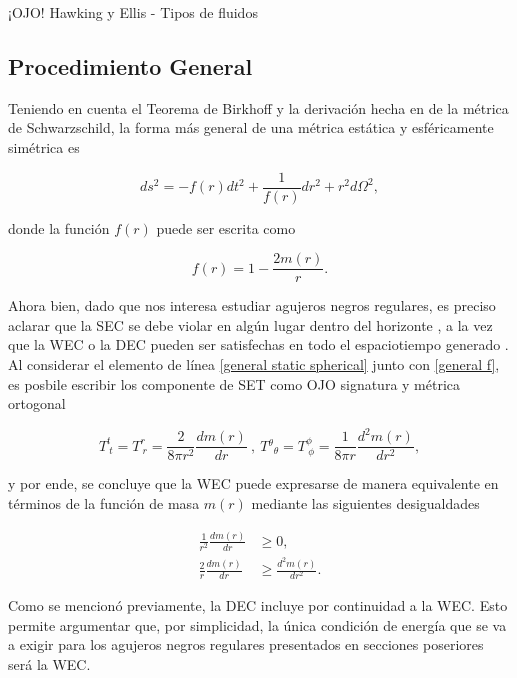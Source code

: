 \documentclass{article}
\numberwithin{equation}{section}
\theoremstyle{definition}
\begin{document}
¡OJO! Hawking y Ellis - Tipos de fluidos

\subsection{Procedimiento General}

Teniendo en cuenta el Teorema de Birkhoff \cite{gravitation} y la derivación hecha en \cite[Cap. 7]{carroll-lecture-notes} de la métrica de Schwarzschild, la forma más general de una métrica estática y esféricamente simétrica es

\begin{equation}
\label{general static spherical}
ds^2 = -f(r)dt^2 + \frac{1}{f(r)}dr^2 + r^2d\Omega^2,
\end{equation}

donde la función $f(r)$ puede ser escrita como

\begin{equation}
\label{general f}
f(r) = 1 - \frac{2m(r)}{r}.
\end{equation}

Ahora bien, dado que nos interesa estudiar agujeros negros regulares, es preciso aclarar que la SEC se debe violar en algún lugar dentro del horizonte \cite{zaslavskii}, a la vez que la WEC o la DEC pueden ser satisfechas en todo el espaciotiempo generado \cite{dymnikova2004}. Al considerar el elemento de línea \eqref{general static spherical} junto con \eqref{general f}, es posbile escribir los componente de SET como \cite{vanegas-weak} OJO signatura y métrica ortogonal

\begin{equation}
\label{wec set comp}
T^{t}_{\ t} = T^{r}_{\ r} = \frac{2}{8 \pi r^2} \frac{dm(r)}{dr}\ ,\ T{^\theta}_{\theta} = T^{\phi}_{\ \phi} = \frac{1}{8 \pi r} \frac{d^2m(r)}{dr^2},
\end{equation}

y por ende, se concluye que la WEC puede expresarse de manera equivalente en términos de la función de masa $m(r)$ mediante las siguientes desigualdades

\begin{align}
\label{mass wec ineq}
\frac{1}{r^2}\frac{dm(r)}{dr} &\geq 0,\\
\frac{2}{r}\frac{dm(r)}{dr} &\geq \frac{d^2m(r)}{dr^2}.
\end{align}

Como se mencionó previamente, la DEC incluye por continuidad a la WEC. Esto permite argumentar que, por simplicidad, la única condición de energía que se va a exigir para los agujeros negros regulares presentados en secciones poseriores será la WEC.
\end{document}
